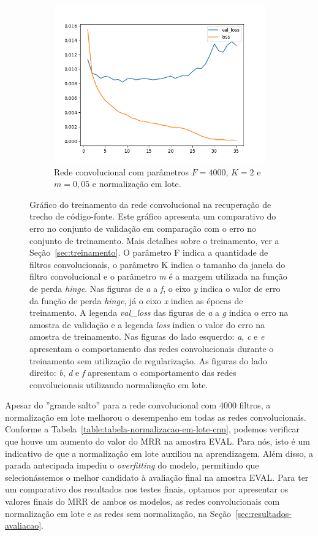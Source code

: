 \begin{figure}[H]
\begin{subfigure}{.5\textwidth}
  \includegraphics[width=.8\linewidth]{figuras/ape-ajustes-hiper-parametros/cnn-with-bn-4000-k-2-m-005.png}
  \caption{Rede convolucional com parâmetros $F = 4000$, $K = 2$ e $m = 0,05$ e normalização em lote.}
  \label{fig:cnn-4000-k-2-m-005-normalizacao-em-lote}
\end{subfigure}

\caption{Gráfico do treinamento da rede convolucional na recuperação de trecho de código-fonte. Este gráfico apresenta um comparativo do erro no conjunto de validação em comparação com o erro no conjunto de treinamento. Mais detalhes sobre o treinamento, ver a Seção~\ref{sec:treinamento}. O parâmetro F indica a quantidade de filtros convolucionais, o parâmetro K indica o tamanho da janela do filtro convolucional e o parâmetro \emph{m} é a margem utilizada na função de perda \textit{hinge}. Nas figuras de \emph{a} a \emph{f}, o eixo \emph{y} indica o valor de erro da função de perda \textit{hinge}, já o eixo \emph{x} indica as épocas de treinamento. A legenda \emph{val\_loss} das figuras de \emph{a} a \emph{g} indica o erro na amostra de validação e a legenda \emph{loss} indica o valor do erro na amostra de treinamento. Nas figuras do lado esquerdo: \emph{a}, \emph{c} e \emph{e} apresentam o comportamento das redes convolucionais durante o treinamento sem utilização de regularização. As figuras do lado direito: \emph{b}, \emph{d} e \emph{f} apresentam o comportamento das redes convolucionais utilizando normalização em lote. }
\label{fig:treinamento-cnn-normalizacao-em-lote}
\end{figure}

Apesar do ''grande salto'' para a rede convolucional com 4000 filtros, a normalização em lote melhorou o desempenho em todas as redes convolucionais. Conforme a Tabela~\ref{table:tabela-normalizacao-em-lote-cnn}, podemos verificar que houve um aumento do valor do MRR na amostra EVAL. Para nós, isto é um indicativo de que a normalização em lote auxiliou na aprendizagem. Além disso, a parada antecipada impediu o \textit{overfitting} do modelo, permitindo que selecionássemos o melhor candidato à avaliação final na amostra EVAL. Para ter um comparativo dos resultados nos testes finais, optamos por apresentar os valores finais do MRR de ambos os modelos, as redes convolucionais com normalização em lote e as redes sem normalização, na Seção~\ref{sec:resultados-avaliacao}.


